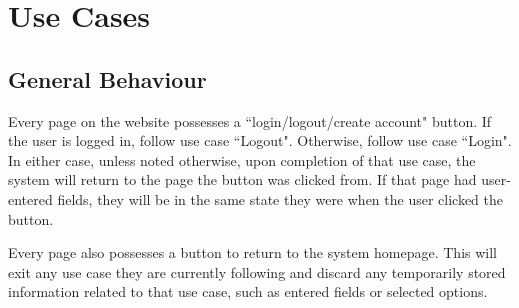 \section{Use Cases}

\subsection{General Behaviour}

Every page on the website possesses a ``login/logout/create account" button.  If the user is logged in, follow use case ``Logout".  Otherwise, follow use case ``Login".  In either case, unless noted otherwise, upon completion of that use case, the system will return to the page the button was clicked from.  If that page had user-entered fields, they will be in the same state they were when the user clicked the button.

Every page also possesses a button to return to the system homepage.  This will exit any use case they are currently following and discard any temporarily stored information related to that use case, such as entered fields or selected options.

